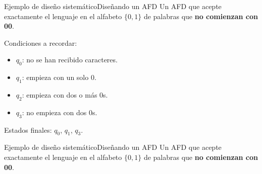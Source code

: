 \documentclass[spanish, handout]{beamer}
\begin{document}
\begin{frame}{Ejemplo de diseño sistemático}{Diseñando un AFD}
    Un AFD que acepte exactamente el lenguaje en el alfabeto $\{0,1\}$ de palabras que \textbf{no comienzan con 00}. \pause

    \bigskip

    Condiciones a recordar: \pause

    \begin{itemize}
        \item $q_0$: no se han recibido caracteres. \pause
        \item $q_1$: empieza con un solo $0$. \pause
        \item $q_2$: empieza con dos o más $0$s. \pause
        \item $q_3$: no empieza con dos $0$s. \pause
    \end{itemize}

    Estados finales: $q_0$, $q_1$, $q_3$.
    
\end{frame}

\begin{frame}{Ejemplo de diseño sistemático}{Diseñando un AFD}
    Un AFD que acepte exactamente el lenguaje en el alfabeto $\{0,1\}$ de palabras que \textbf{no comienzan con 00}.

    \begin{center}
    \end{center}
\end{frame}
\end{document}
